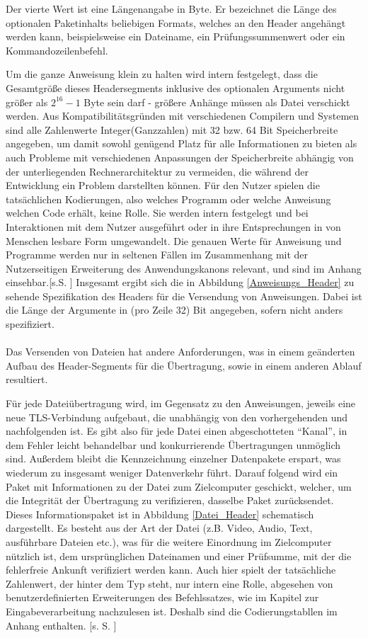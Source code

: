 Der vierte Wert ist eine Längenangabe in Byte.
Er bezeichnet die Länge des optionalen Paketinhalts beliebigen Formats, welches an den Header angehängt werden kann, beispielsweise ein Dateiname, ein Prüfungssummenwert oder ein Kommandozeilenbefehl.\par
Um die ganze Anweisung klein zu halten wird intern festgelegt, dass die Gesamtgröße dieses Headersegments inklusive des optionalen Arguments nicht größer als $2^{16}-1$ Byte sein darf - größere Anhänge müssen als Datei verschickt werden.
Aus Kompatibilitätsgründen mit verschiedenen Compilern und Systemen sind alle Zahlenwerte Integer(Ganzzahlen) mit 32 bzw. 64 Bit Speicherbreite angegeben, um damit sowohl genügend Platz für alle Informationen zu bieten als auch Probleme mit verschiedenen Anpassungen der Speicherbreite abhängig von der unterliegenden Rechnerarchitektur zu vermeiden, die während der Entwicklung ein Problem darstellten können.
Für den Nutzer spielen die tatsächlichen Kodierungen, also welches Programm oder welche Anweisung welchen Code erhält, keine Rolle. Sie werden intern festgelegt und bei  Interaktionen mit dem Nutzer ausgeführt oder in ihre Entsprechungen in von Menschen lesbare Form umgewandelt.
Die genauen Werte für Anweisung und Programme werden nur in seltenen Fällen im Zusammenhang mit der Nutzerseitigen Erweiterung des Anwendungskanons relevant, und sind im Anhang einsehbar.[s.S. \pageref{enums}]
Insgesamt ergibt sich die in Abbildung \ref{Anweisungs_Header} zu sehende Spezifikation des Headers für die Versendung von Anweisungen.
Dabei ist die Länge der Argumente in (pro Zeile 32) Bit angegeben, sofern nicht anders spezifiziert.\\\\
Das Versenden von Dateien hat andere Anforderungen, was in einem geänderten Aufbau des Header-Segments für die Übertragung, sowie in einem anderen Ablauf resultiert.\par
Für jede Dateiübertragung wird, im Gegensatz zu den Anweisungen, jeweils eine neue TLS-Verbindung aufgebaut, die unabhängig von den vorhergehenden und nachfolgenden ist. Es gibt also für jede Datei einen abgeschotteten "`Kanal"', in dem Fehler leicht behandelbar und konkurrierende Übertragungen unmöglich sind. 
Außerdem bleibt die Kennzeichnung einzelner Datenpakete erspart, was wiederum zu insgesamt weniger Datenverkehr führt.
Darauf folgend wird ein Paket mit Informationen zu der Datei zum Zielcomputer geschickt, welcher, um die Integrität der Übertragung zu verifizieren, dasselbe Paket zurücksendet.\\
Dieses Informationspaket ist in Abbildung \ref{Datei_Header} schematisch dargestellt.
Es besteht aus der Art der Datei (z.B. Video, Audio, Text, ausführbare Dateien etc.), was für die weitere Einordnung im Zielcomputer nützlich ist, dem ursprünglichen Datei\-namen und einer Prüfsumme, mit der die fehlerfreie Ankunft verifiziert werden kann. 
Auch hier spielt der tatsächliche Zahlenwert, der hinter dem Typ steht, nur intern eine Rolle, abgesehen von benutzerdefinierten Erweiterungen des Befehlssatzes, wie im Kapitel zur Eingabeverarbeitung nachzulesen ist. 
Deshalb sind die Codierungstabllen im Anhang enthalten. [s. S. \pageref{enums}]\\\\

